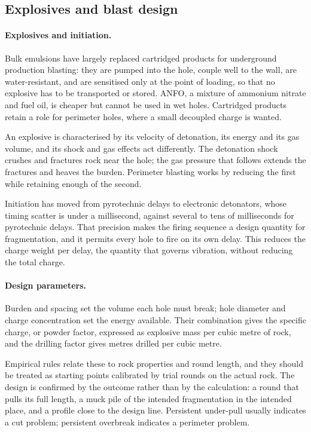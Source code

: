 \subsection{Explosives and blast design}
\label{sec:explosives-design}

\paragraph{Explosives and initiation.}
Bulk emulsions have largely replaced cartridged products for underground
production blasting: they are pumped into the hole, couple well to the wall,
are water-resistant, and are sensitised only at the point of loading, so
that no explosive has to be transported or stored. ANFO, a mixture
of ammonium nitrate and fuel oil, is cheaper but cannot be used in wet holes.
Cartridged products retain a role for perimeter
holes, where a small decoupled charge is wanted.

An explosive is characterised by its velocity of detonation, its energy and
its gas volume, and its shock and gas effects act differently. The detonation shock
crushes and fractures rock near the hole; the gas pressure that follows
extends the fractures and heaves the burden. Perimeter blasting works by
reducing the first while retaining enough of the second.

Initiation has moved from pyrotechnic delays to electronic detonators, whose
timing scatter is under a millisecond, against several to tens of
milliseconds for pyrotechnic delays. That precision makes the firing sequence a
design quantity for fragmentation, and it permits every hole to fire on its own delay. This reduces the
charge weight per delay, the quantity that governs vibration, without
reducing the total charge.

\paragraph{Design parameters.}
Burden and spacing set the volume each hole must break; hole diameter and
charge concentration set the energy available. Their combination gives the
specific charge, or powder factor, expressed as explosive mass per cubic metre
of rock, and the drilling factor gives metres drilled per cubic metre.

Empirical rules relate these to rock properties and round length, and they
should be treated as starting points calibrated by trial rounds on the actual
rock. The design is confirmed by the outcome rather than by the calculation: a round that pulls
its full length, a muck pile of the intended fragmentation in the intended
place, and a profile close to the design line. Persistent under-pull usually
indicates a cut problem; persistent overbreak indicates a perimeter problem.

